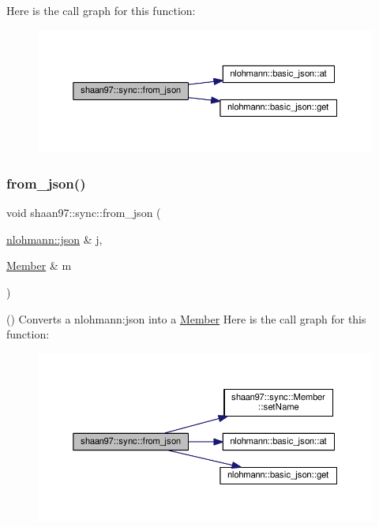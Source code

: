 Here is the call graph for this function\+:
\nopagebreak
\begin{figure}[H]
\begin{center}
\leavevmode
\includegraphics[width=350pt]{group___de_gaba06015bb8b13049b093f0bde8e89377_cgraph}
\end{center}
\end{figure}
\mbox{\label{group___de_ga35dd3deb42a1ec52e00a2980b5c7c842}} 
\subsubsection{\texorpdfstring{from\+\_\+json()}{from\_json()}\hspace{0.1cm}{\footnotesize\ttfamily [2/2]}}
{\footnotesize\ttfamily void shaan97\+::sync\+::from\+\_\+json (\begin{DoxyParamCaption}\item[{\hyperlink{namespacenlohmann_a2bfd99e845a2e5cd90aeaf1b1431f474}{nlohmann\+::json} \&}]{j,  }\item[{\hyperlink{classshaan97_1_1sync_1_1_member}{Member} \&}]{m }\end{DoxyParamCaption})}

() Converts a {\ttfamily nlohmann\+:json} into a {\ttfamily \hyperlink{classshaan97_1_1sync_1_1_member}{Member}} Here is the call graph for this function\+:
\nopagebreak
\begin{figure}[H]
\begin{center}
\leavevmode
\includegraphics[width=350pt]{group___de_ga35dd3deb42a1ec52e00a2980b5c7c842_cgraph}
\end{center}
\end{figure}
\mbox{\label{group___de_ga213581ca789d5151c699fb4cb30db916}} 
